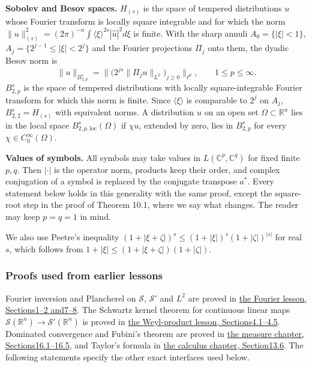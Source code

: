 \documentclass[
  11pt,
]{article}
\begin{document}
\textbf{Sobolev and Besov spaces.} \(H_{(s)}\) is the space of tempered
distributions \(u\) whose Fourier transform is locally square integrable
and for which the norm
\(\|u\|_{(s)}^2=(2\pi)^{-n}\int\langle\xi\rangle^{2s}|\widehat u|^2d\xi\)
is finite. With the sharp annuli \(A_0=\{|\xi|<1\}\),
\(A_j=\{2^{j-1}\leq|\xi|<2^j\}\) and the Fourier projections \(\Pi_j\)
onto them, the dyadic Besov norm is \[
\|u\|_{B^s_{2,p}}=\big\|\big(2^{js}\|\Pi_ju\|_{L^2}\big)_{j\geq0}\big\|_{\ell^p},\qquad 1\leq p\leq\infty .
\tag{1.1}
\] \(B^s_{2,p}\) is the space of tempered distributions with locally
square-integrable Fourier transform for which this norm is finite. Since
\(\langle\xi\rangle\) is comparable to \(2^j\) on \(A_j\),
\(B^s_{2,2}=H_{(s)}\) with equivalent norms. A distribution \(u\) on an
open set \(\Omega\subset\mathbb R^n\) lies in the local space
\(B^s_{2,p,\mathrm{loc}}(\Omega)\) if \(\chi u\), extended by zero, lies
in \(B^s_{2,p}\) for every \(\chi\in C_0^\infty(\Omega)\).

\textbf{Values of symbols.} All symbols may take values in
\(L(\mathbb C^p,\mathbb C^q)\) for fixed finite \(p,q\). Then
\(|\cdot|\) is the operator norm, products keep their order, and complex
conjugation of a symbol is replaced by the conjugate transpose \(a^*\).
Every statement below holds in this generality with the same proof,
except the square-root step in the proof of Theorem 10.1, where we say
what changes. The reader may keep \(p=q=1\) in mind.

We also use Peetre's inequality
\((1+|\xi+\zeta|)^s\leq(1+|\xi|)^s(1+|\zeta|)^{|s|}\) for real \(s\),
which follows from \(1+|\xi|\leq(1+|\xi+\zeta|)(1+|\zeta|)\).

\subsubsection{Proofs used from earlier
lessons}\label{proofs-used-from-earlier-lessons}

Fourier inversion and Plancherel on \(\mathcal S\), \(\mathcal S'\) and
\(L^2\) are proved in \href{prerequisite-bridges.pdf\#section*.2}{the
Fourier lesson, Sections1--2 and7--8}. The Schwartz kernel theorem for
continuous linear maps
\(\mathcal S(\mathbb R^n)\to\mathcal S'(\mathbb R^n)\) is proved in
\href{weyl-metric-products.pdf\#section*.27}{the Weyl-product
lesson, Sections4.1--4.5}. Dominated convergence and Fubini's theorem
are proved in
\href{banach-foundation-bridges.pdf\#section*.118}{the measure
chapter, Sections16.1--16.5}, and Taylor's formula in
\href{metric-foundation-bridges.pdf\#section*.106}{the calculus
chapter, Section13.6}. The following statements specify the other exact
interfaces used below.
\end{document}

